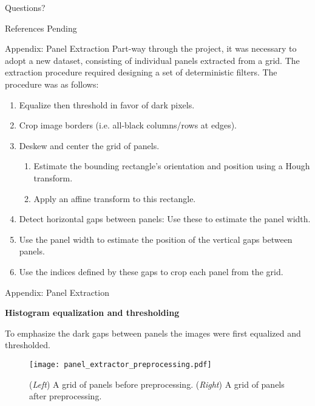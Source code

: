 \documentclass[10pt]{beamer}
\begin{document}
\begin{frame}[standout]
  Questions?
\end{frame}


\begin{frame}{References}
Pending
\cite{}
\end{frame}


\appendix

\begin{frame}{Appendix: Panel Extraction}
	Part-way through the project, it was necessary to adopt a new dataset, consisting of individual panels extracted from a grid. The extraction procedure required designing a set of deterministic filters. The procedure was as follows:
	\begin{enumerate}
	\item Equalize then threshold in favor of dark pixels.
    	\item Crop image borders (i.e. all-black columns/rows at edges).
    	\item Deskew and center the grid of panels.
    		\begin{enumerate}
    			\item Estimate the bounding rectangle's orientation and position using a Hough transform.
    			\item Apply an affine transform to this rectangle.
    		\end{enumerate}
    	\item Detect horizontal gaps between panels: Use these to estimate the panel width.
    	\item Use the panel width to estimate the position of the vertical gaps between panels.
    	\item Use the indices defined by these gaps to crop each panel from the grid.
	\end{enumerate}
\end{frame}

\begin{frame}{Appendix: Panel Extraction}

	\textbf{Histogram equalization and thresholding}
	
	To emphasize the dark gaps between panels the images were first equalized and thresholded.
	\begin{figure}[b]
		\texttt{[image: panel\_extractor\_preprocessing.pdf]}
		\caption{(\emph{Left}) A grid of panels before preprocessing. (\emph{Right}) A grid of panels after preprocessing.}
	\end{figure}
\end{frame}
\end{document}
